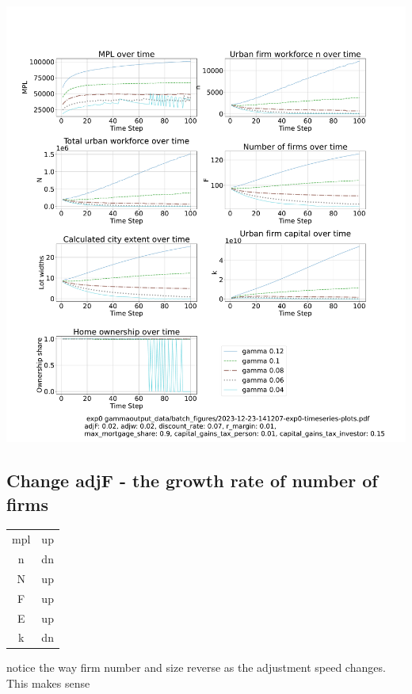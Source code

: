 \documentclass{article}
\begin{document}

 \hspace*{-2.5cm}\includegraphics[trim= 1.5cm 3.65cm 2cm 4.0cm, clip, scale=.3]{fig/Analysis/Gamma-low-5-30.pdf}

\newpage %

\subsection{Change adjF - the growth rate of number of firms }

\begin{multicols}{2}
\begin{tabular}{c|c}
  mpl   &  up\\
  n   &  dn\\
  N   &  up\\
  F   & up \\
  E   &  up\\
  k   & dn
\end{tabular}

  notice the way firm number and size reverse as the adjustment speed changes. This makes sense
  
\end{multicols}
\end{document}
